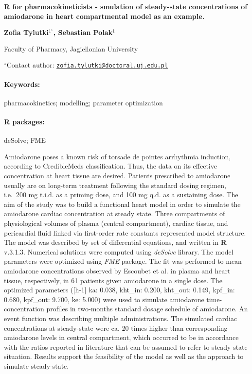 \documentclass[11pt, a4paper]{article}
\renewcommand{\title}[1]{\begin{center}{\bf \LARGE #1}\end{center}}
\newcommand{\keywords}{\paragraph{Keywords:}}
\newcommand{\packages}{\paragraph{R packages:}}
\begin{document}
\pagestyle{empty}

\title{R for pharmacokineticists - smulation of steady-state concentrations of
amiodarone in heart compartmental model as an example.}

\begin{center}
  {\bf Zofia Tylutki$^{1^\star}$, Sebastian Polak$^{1}$}
\end{center}

\vskip 0.3cm

\begin{affiliations}
\begin{enumerate}
\begin{minipage}{0.915\textwidth}
\centering
\item Faculty of Pharmacy, Jagiellonian University \\[-2pt]
\end{minipage}
\end{enumerate}
$^\star$Contact author: \href{mailto:zofia.tylutki@doctoral.uj.edu.pl}{\nolinkurl{zofia.tylutki@doctoral.uj.edu.pl}}\\
\end{affiliations}

\vskip 0.5cm

\begin{minipage}{0.915\textwidth}
\keywords pharmacokinetics; modelling; parameter optimization
\packages deSolve; FME
\end{minipage}

\vskip 0.8cm

Amiodarone poses a known risk of torsade de pointes arrhythmia
induction, according to CredibleMeds classification. Thus, the data on
its effective concentration at heart tissue are desired. Patients
prescribed to amiodarone usually are on long-term treatment following
the standard dosing regimen, i.e.~200 mg t.i.d. as a priming dose, and
100 mg q.d. as a sustaining dose. The aim of the study was to build a
functional heart model in order to simulate the amiodarone cardiac
concentration at steady state. Three compartments of physiological
volumes of plasma (central compartment), cardiac tissue, and pericardial
fluid linked via first-order rate constants represented model structure.
The model was described by set of differential equations, and written in
\textbf{R} v.3.1.3. Numerical solutions were computed using
\emph{deSolve} library. The model parameters were optimized using
\emph{FME} package. The fit was performed to mean amiodarone
concentrations observed by Escoubet et al. in plasma and heart tissue,
respectively, in 61 patients given amiodarone in a single dose. The
optimized parameters ({[}h-1{]} ka: 0.038, kht\_in: 0.200, kht\_out:
0.149, kpf\_in: 0.680, kpf\_out: 9.700, ke: 5.000) were used to simulate
amiodarone time-concentration profiles in two-months standard dosage
schedule of amiodarone. An event function was describing multiple
administrations. The simulated cardiac concentrations at steady-state
were ca. 20 times higher than corresponding amiodarone levels in central
compartment, which occurred to be in accordance with the ratios reported
in literature that can be assumed to refer to steady state situation.
Results support the feasibility of the model as well as the approach to
simulate steady-state.
\end{document}
